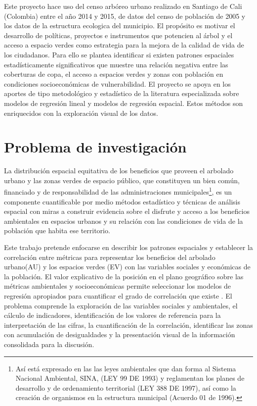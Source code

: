 \documentclass[12pt,]{book}
\let\rmarkdownfootnote\footnote%
\def\footnote{\protect\rmarkdownfootnote}
\begin{document}
Este proyecto hace uso del censo arbóreo urbano realizado en Santiago de
Cali (Colombia) entre el año 2014 y 2015, de datos del censo de
población de 2005 y los datos de la estructura ecologica del municipio.
El propósito es motivar el desarrollo de políticas, proyectos e
instrumentos que potencien al árbol y el acceso a espacio verdes como
estrategia para la mejora de la calidad de vida de los ciudadanos. Para
ello se plantea identificar si existen patrones espaciales
estadísticamente significativos que muestre una relación negativa entre
las coberturas de copa, el acceso a espacios verdes y zonas con
población en condiciones socioeconómicas de vulnerabilidad. El proyecto
se apoya en los aportes de tipo metodológico y estadístico de la
literatura especializada sobre modelos de regresión lineal y modelos de
regresión espacial. Estos métodos son enriquecidos con la exploración
visual de los datos.

\section{Problema de investigación}\label{problema-de-investigacion}

La distribución espacial equitativa de los beneficios que proveen el
arbolado urbano y las zonas verdes de espacio público, que constituyen
un bien común, financiado y de responsabilidad de las administraciones
municipales\footnote{Así está expresado en las las leyes ambientales que
  dan forma al Sistema Nacional Ambiental, SINA, (LEY 99 DE 1993) y
  reglamentan los planes de desarrollo y de ordenamiento territorial
  (LEY 388 DE 1997), así como la creación de organismos en la estructura
  municipal (Acuerdo 01 de 1996).}, es un componente cuantificable por
medio métodos estadístico y técnicas de análisis espacial con miras a
construir evidencia sobre el disfrute y acceso a los beneficios
ambientales en espacios urbanos y su relación con las condiciones de
vida de la población que habita ese territorio.

Este trabajo pretende enfocarse en describir los patrones espaciales y
establecer la correlación entre métricas para representar los beneficios
del arbolado urbano(AU) y los espacios verdes (EV) con las variables
sociales y económicas de la población. El valor explicativo de la
posición en el plano geográfico sobre las métricas ambientales y
socioeconómicas permite seleccionar los modelos de regresión apropiados
para cuantificar el grado de correlación que existe
\citep{fotheringham_geographically_1998}. El problema comprende la
exploración de las variables sociales y ambientales, el cálculo de
indicadores, identificación de los valores de referencia para la
interpretación de las cifras, la cuantificación de la correlación,
identificar las zonas con acumulación de desigualdades y la presentación
visual de la información consolidada para la discusión.
\end{document}
